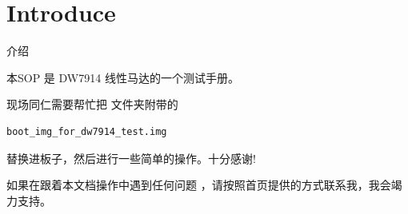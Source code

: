 \section{Introduce}

\begin{frame}[fragile]{介绍}

本SOP 是 DW7914 线性马达的一个测试手册。


现场同仁需要帮忙把 文件夹附带的
\begin{lstlisting}
boot_img_for_dw7914_test.img
\end{lstlisting}
替换进板子，然后进行一些简单的操作。十分感谢!



如果在跟着本文档操作中遇到任何问题 ，请按照首页提供的方式联系我，我会竭力支持。
\end{frame}


